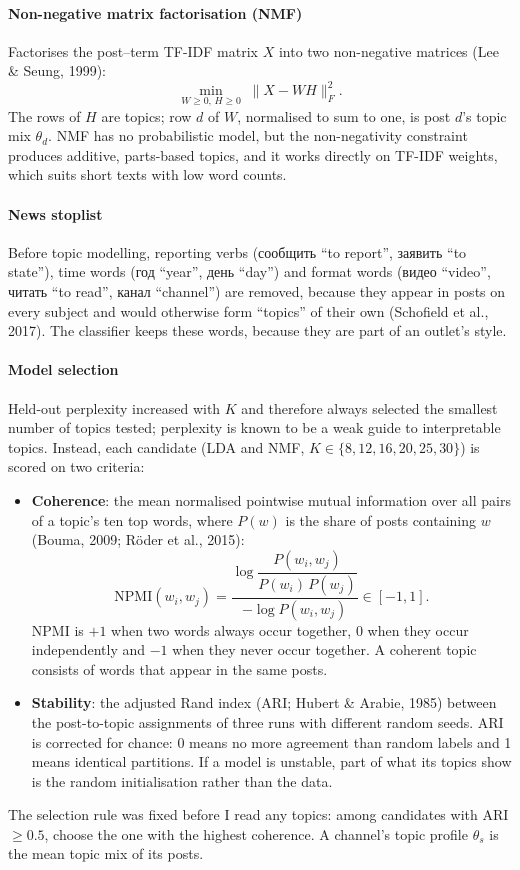 \documentclass[11pt,a4paper]{article}
\begin{document}
\paragraph{Non-negative matrix factorisation (NMF)} Factorises the post--term TF-IDF matrix $X$ into two non-negative matrices (Lee \& Seung, 1999):
\begin{equation}
\min_{W \geq 0,\, H \geq 0} \; \lVert X - WH \rVert_F^2 .
\end{equation}
The rows of $H$ are topics; row $d$ of $W$, normalised to sum to one, is post $d$'s topic mix $\theta_d$. NMF has no probabilistic model, but the non-negativity constraint produces additive, parts-based topics, and it works directly on TF-IDF weights, which suits short texts with low word counts.

\paragraph{News stoplist} Before topic modelling, reporting verbs (сообщить ``to report'', заявить ``to state''), time words (год ``year'', день ``day'') and format words (видео ``video'', читать ``to read'', канал ``channel'') are removed, because they appear in posts on every subject and would otherwise form ``topics'' of their own (Schofield et al., 2017). The classifier keeps these words, because they are part of an outlet's style.

\paragraph{Model selection} Held-out perplexity increased with $K$ and therefore always selected the smallest number of topics tested; perplexity is known to be a weak guide to interpretable topics. Instead, each candidate (LDA and NMF, $K\in\{8,12,16,20,25,30\}$) is scored on two criteria:
\begin{itemize}
\item \textbf{Coherence}: the mean normalised pointwise mutual information over all pairs of a topic's ten top words, where $P(w)$ is the share of posts containing $w$ (Bouma, 2009; Röder et al., 2015):
\begin{equation}
\mathrm{NPMI}(w_i, w_j) = \frac{\log \dfrac{P(w_i, w_j)}{P(w_i)\,P(w_j)}}{-\log P(w_i, w_j)} \in [-1, 1].
\end{equation}
NPMI is $+1$ when two words always occur together, 0 when they occur independently and $-1$ when they never occur together. A coherent topic consists of words that appear in the same posts.
\item \textbf{Stability}: the adjusted Rand index (ARI; Hubert \& Arabie, 1985) between the post-to-topic assignments of three runs with different random seeds. ARI is corrected for chance: 0 means no more agreement than random labels and 1 means identical partitions. If a model is unstable, part of what its topics show is the random initialisation rather than the data.
\end{itemize}
The selection rule was fixed before I read any topics: among candidates with ARI $\geq 0.5$, choose the one with the highest coherence. A channel's topic profile $\theta_s$ is the mean topic mix of its posts.
\end{document}
